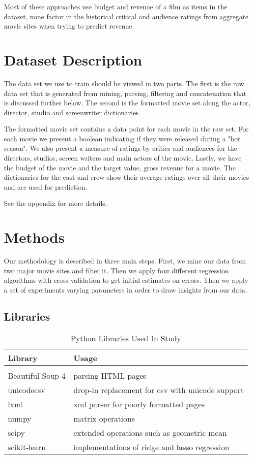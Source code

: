 \documentclass[conference]{IEEEtran}
\begin{document}
Most of these approaches use budget and revenue of a film as items in the 
dataset, none factor in the historical critical and audience ratings 
from aggregate movie sites when trying to predict revenue. 

\section{Dataset Description}
The data set we use to train should be viewed in two parts. The first is the raw data set that 
is generated from mining, parsing, filtering and concatenation that is discussed further
below. The second is the formatted movie set along the actor, director, studio and screenwriter dictionaries. 

The formatted movie set contains a data point for each movie in the raw set. For each movie we present a boolean 
indicating if they were released during a "hot season". We also present a measure of ratings
by critics and audiences for the directors, studios, screen writers and main actors of the movie. 
Lastly, we have the budget of the movie and the target value, gross revenue for a movie. The dictionaries for 
the cast and crew show their average ratings over all their movies and are used for prediction.


See the appendix for more details.

\section{Methods}
Our methodology is described in three main steps. First, we mine our data from 
two major movie sites and filter it. Then we apply four different regression algorithms 
with cross validation to get initial estimates on errors. Then we apply a set of experiments 
varying parameters in order to draw insights from our data.

\subsection{Libraries}
\begin{table}[h]
\caption{Python Libraries Used In Study}
\label{table:pylibs}
\begin{tabular}{l|l}
Library          & Usage \\
\hline
\\
Beautiful Soup 4\cite{beautifulsoup} & parsing HTML pages \\
unicodecsv\cite{unicodecsv}       & drop-in replacement for csv with unicode support \\
lxml\cite{lxml}             & xml parser for poorly formatted pages \\
numpy\cite{numpy}           & matrix operations\\
scipy\cite{scipy}            & extended operations such as geometric mean \\
scikit-learn\cite{scikit-learn}     & implementations of ridge and lasso regression \\ 
\end{tabular}
\end{table}
\end{document}
